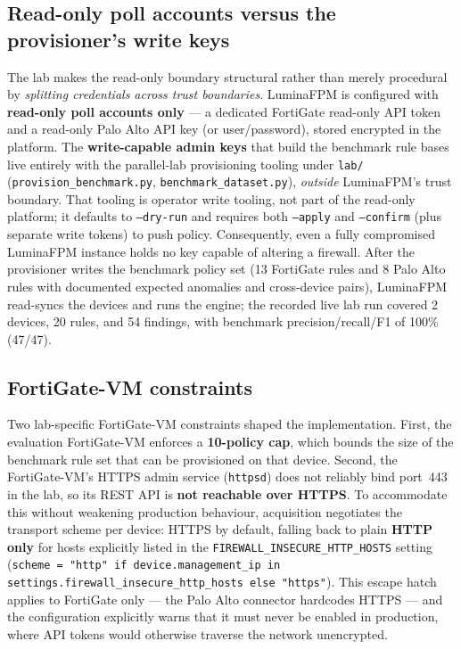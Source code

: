 \subsection*{Read-only poll accounts versus the provisioner's write keys}
The lab makes the read-only boundary structural rather than merely procedural by \emph{splitting credentials across trust boundaries}. LuminaFPM is configured with \textbf{read-only poll accounts only} — a dedicated FortiGate read-only API token and a read-only Palo Alto API key (or user/password), stored encrypted in the platform. The \textbf{write-capable admin keys} that build the benchmark rule bases live entirely with the parallel-lab provisioning tooling under \texttt{lab/} (\texttt{provision\_benchmark.py}, \texttt{benchmark\_dataset.py}), \emph{outside} LuminaFPM's trust boundary. That tooling is operator write tooling, not part of the read-only platform; it defaults to \texttt{--dry-run} and requires both \texttt{--apply} and \texttt{--confirm} (plus separate write tokens) to push policy. Consequently, even a fully compromised LuminaFPM instance holds no key capable of altering a firewall. After the provisioner writes the benchmark policy set (13 FortiGate rules and 8 Palo Alto rules with documented expected anomalies and cross-device pairs), LuminaFPM read-syncs the devices and runs the engine; the recorded live lab run covered 2 devices, 20 rules, and 54 findings, with benchmark precision/recall/F1 of 100\% (47/47).

\subsection*{FortiGate-VM constraints}
Two lab-specific FortiGate-VM constraints shaped the implementation. First, the evaluation FortiGate-VM enforces a \textbf{10-policy cap}, which bounds the size of the benchmark rule set that can be provisioned on that device. Second, the FortiGate-VM's HTTPS admin service (\texttt{httpsd}) does not reliably bind port~443 in the lab, so its REST API is \textbf{not reachable over HTTPS}. To accommodate this without weakening production behaviour, acquisition negotiates the transport scheme per device: HTTPS by default, falling back to plain \textbf{HTTP only} for hosts explicitly listed in the \texttt{FIREWALL\_INSECURE\_HTTP\_HOSTS} setting (\texttt{scheme = "http" if device.management\_ip in settings.firewall\_insecure\_http\_hosts else "https"}). This escape hatch applies to FortiGate only — the Palo Alto connector hardcodes HTTPS — and the configuration explicitly warns that it must never be enabled in production, where API tokens would otherwise traverse the network unencrypted.
